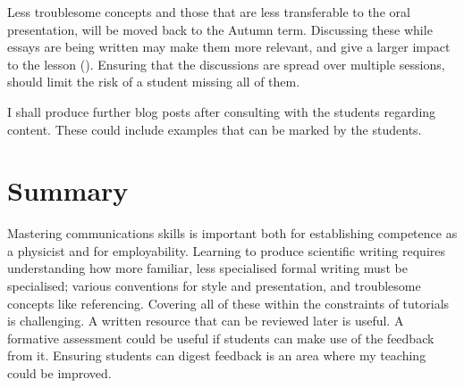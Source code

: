 Less troublesome concepts and those that are less transferable to the oral presentation, will be moved back to the Autumn term. Discussing these while essays are being written may make them more relevant, and give a larger impact to the lesson (). Ensuring that the discussions are spread over multiple sessions, should limit the risk of a student missing all of them.

I shall produce further blog posts after consulting with the students regarding content. These could include examples that can be marked by the students.

\section{Summary}

Mastering communications skills is important both for establishing competence as a physicist and for employability. Learning to produce scientific writing requires understanding how more familiar, less specialised formal writing must be specialised; various conventions for style and presentation, and troublesome concepts like referencing. Covering all of these within the constraints of tutorials is challenging. A written resource that can be reviewed later is useful. A formative assessment could be useful if students can make use of the feedback from it. Ensuring students can digest feedback is an area where my teaching could be improved.
